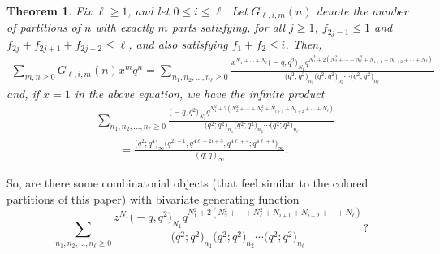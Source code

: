 \documentclass[10pt,a4paper]{amsart}
\numberwithin{equation}{section}
\newtheorem{Theorem}{Theorem}[section]
\theoremstyle{definition}
\begin{document}
\begin{Theorem}
Fix $\ell\ge 1$, and let $0\le i\le \ell$. Let $G_{\ell,i,m}(n)$ denote the number of partitions of $n$ with exactly $m$ parts satisfying, for all $j\ge1$, $f_{2j-1}\le 1$ and
$f_{2j}+f_{2j+1}+f_{2j+2}\le\ell$, and also satisfying $f_1+f_2\le i$. Then,
\begin{gather*}
\sum_{m,n \ge 0} G_{\ell,i,m}(n) x^m q^n = \sum_{n_1,n_2,\dots,n_{\ell}\ge 0} \frac{x^{N_1+\cdots+N_\ell} \bigl(-q,q^2\bigr)_{N_1}q^{N_1^2+2(N_2^2+\cdots+N_{\ell}^2+N_{i+1}+N_{i+2}+\cdots+N_{\ell})}}{\bigl(q^2;q^2\bigr)_{n_1}\bigl(q^2;q^2\bigr)_{n_2}\cdots\bigl(q^2;q^2\bigr)_{n_{\ell}}}
\end{gather*}
and, if $x=1$ in the above equation, we have the infinite product
\begin{align*}
&\sum_{n_1,n_2,\dots,n_{\ell}\ge 0} \frac{ \bigl(-q,q^2\bigr)_{N_1}q^{N_1^2+2(N_2^2+\cdots+N_{\ell}^2+N_{i+1}+N_{i+2}+\cdots+N_{\ell})}}{\bigl(q^2;q^2\bigr)_{n_1}\bigl(q^2;q^2\bigr)_{n_2}\cdots\bigl(q^2;q^2\bigr)_{n_{\ell}}} \\
&\qquad= \frac{\bigl(q^2;q^4\bigr)_\infty\bigl(q^{2i+1},q^{4\ell-2i+3},q^{4\ell+4};q^{4\ell+4}\bigr)_\infty}{(q;q)_\infty}.
\end{align*}
\end{Theorem}
So, are there some combinatorial objects (that feel similar to the colored partitions of this paper) with bivariate generating function
\begin{equation*}
\sum_{n_1,n_2,\dots,n_{\ell}\ge 0} \frac{z^{N_1} \bigl(-q,q^2\bigr)_{N_1}q^{N_1^2+2(N_2^2+\cdots+N_{\ell}^2+N_{i+1}+N_{i+2}+\cdots+N_{\ell})}}{\bigl(q^2;q^2\bigr)_{n_1}\bigl(q^2;q^2\bigr)_{n_2}\cdots\bigl(q^2;q^2\bigr)_{n_{\ell}}}?
\end{equation*}
\end{document}
